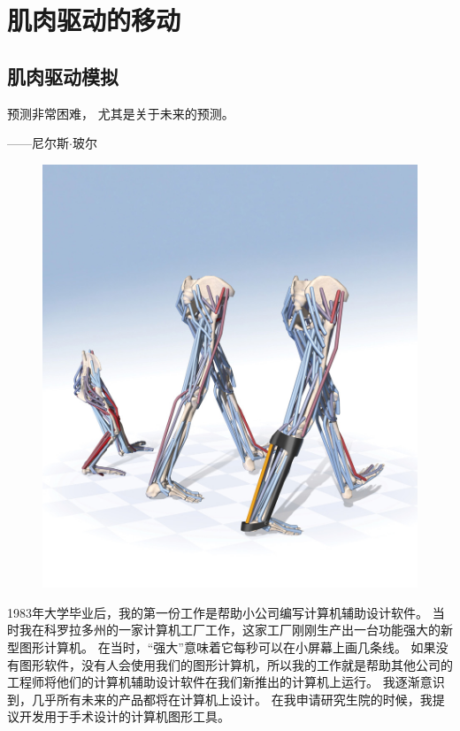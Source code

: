 \part{肌肉驱动的移动}

\chapter{肌肉驱动模拟} \label{chap:chap10}

预测非常困难，
尤其是关于未来的预测。
\begin{flushright}
	——尼尔斯$ \cdot $玻尔
\end{flushright}

\begin{figure}[!htb]
	\centering
	\includegraphics[width=0.9\linewidth]{chap10/10_0}
	\caption*{ \label{fig:10_0}}
\end{figure}

1983年大学毕业后，我的第一份工作是帮助小公司编写计算机辅助设计软件。
当时我在科罗拉多州的一家计算机工厂工作，这家工厂刚刚生产出一台功能强大的新型图形计算机。
在当时，“强大”意味着它每秒可以在小屏幕上画几条线。
如果没有图形软件，没有人会使用我们的图形计算机，所以我的工作就是帮助其他公司的工程师将他们的计算机辅助设计软件在我们新推出的计算机上运行。
我逐渐意识到，几乎所有未来的产品都将在计算机上设计。
在我申请研究生院的时候，我提议开发用于手术设计的计算机图形工具。


